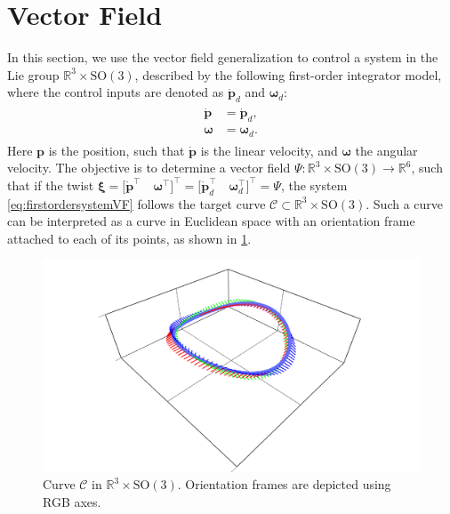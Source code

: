 \section{Vector Field}
In this section, we use the vector field generalization to control a system in the Lie group $\mathbb{R}^3\times\text{SO}(3)$, described by the following first-order integrator model, where the control inputs are denoted as $\dot{\mathbf{p}}_d$ and $\boldsymbol{\omega}_d$:
\begin{align}
\begin{split}
    \dot{\mathbf{p}} &= \dot{\mathbf{p}}_d,\\
    \boldsymbol{\omega} &= \boldsymbol{\omega}_d.\label{eq:firstordersystemVF}
\end{split} 
\end{align}
Here $\mathbf{p}$ is the position, such that $\dot{\mathbf{p}}$ is the linear velocity, and $\boldsymbol{\omega}$ the angular velocity. 
The objective is to determine a vector field $\Psi:\mathbb{R}^3 \times \text{SO}(3)\to\mathbb{R}^6$, such that if the twist $\boldsymbol{\xi} = \bigl[\dot{\mathbf{p}}^\top\quad  \boldsymbol{\omega}^\top \bigr]^\top= \bigl[\dot{\mathbf{p}}_{d}^{\top}\quad \boldsymbol{\omega}_{d}^{\top} \bigr]^\top = \Psi$, the system \eqref{eq:firstordersystemVF} follows the target curve $\mathcal{C} \subset \mathbb{R}^3\times \text{SO}(3)$. Such a curve can be interpreted as a curve in Euclidean space with an orientation frame attached to each of its points, as shown in \cref{fig:curvewithframes}.
\begin{figure}[ht]
    \centering
    \includegraphics[width=.8\linewidth]{figures/curve_with_frames.pdf}
    \caption{Curve $\mathcal{C}$ in $\mathbb{R}^3\times\text{SO}(3)$. Orientation frames are depicted using RGB axes.}
    \label{fig:curvewithframes}
\end{figure}

